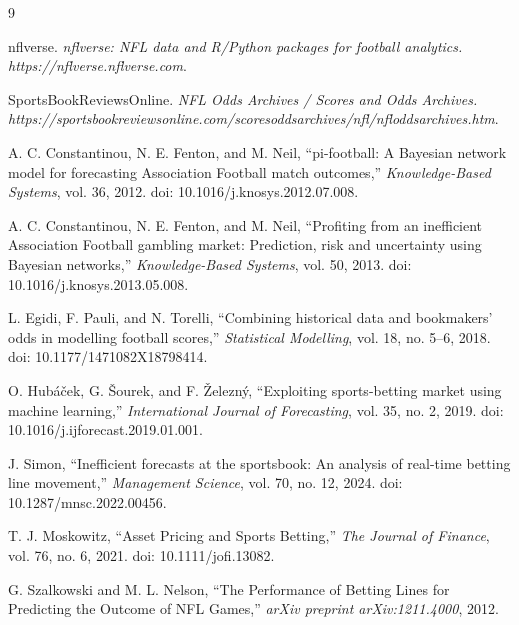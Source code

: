 \documentclass[letterpaper]{article}
\begin{document}
\begin{thebibliography}{9}

nflverse. 
\textit{nflverse: NFL data and R/Python packages for football analytics. https://nflverse.nflverse.com}.

SportsBookReviewsOnline. 
\textit{NFL Odds Archives / Scores and Odds Archives. https://sportsbookreviewsonline.com/scoresoddsarchives/nfl/nfloddsarchives.htm}.

A. C. Constantinou, N. E. Fenton, and M. Neil, 
``pi-football: A Bayesian network model for forecasting Association Football match outcomes,'' 
\textit{Knowledge-Based Systems}, vol. 36, 2012. 
doi: 10.1016/j.knosys.2012.07.008.

A. C. Constantinou, N. E. Fenton, and M. Neil, 
``Profiting from an inefficient Association Football gambling market: Prediction, risk and uncertainty using Bayesian networks,'' 
\textit{Knowledge-Based Systems}, vol. 50, 2013. 
doi: 10.1016/j.knosys.2013.05.008.

L. Egidi, F. Pauli, and N. Torelli, 
``Combining historical data and bookmakers' odds in modelling football scores,'' 
\textit{Statistical Modelling}, vol. 18, no. 5--6, 2018. 
doi: 10.1177/1471082X18798414.

O. Hubáček, G. Šourek, and F. Železný, 
``Exploiting sports-betting market using machine learning,'' 
\textit{International Journal of Forecasting}, vol. 35, no. 2, 2019. 
doi: 10.1016/j.ijforecast.2019.01.001.

J. Simon, 
``Inefficient forecasts at the sportsbook: An analysis of real-time betting line movement,'' 
\textit{Management Science}, vol. 70, no. 12, 2024. 
doi: 10.1287/mnsc.2022.00456.

T. J. Moskowitz, 
``Asset Pricing and Sports Betting,'' 
\textit{The Journal of Finance}, vol. 76, no. 6, 2021. 
doi: 10.1111/jofi.13082.

G. Szalkowski and M. L. Nelson, 
``The Performance of Betting Lines for Predicting the Outcome of NFL Games,'' 
\textit{arXiv preprint arXiv:1211.4000}, 2012.

\end{thebibliography}
\end{document}

